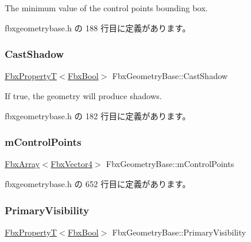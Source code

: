 The minimum value of the control points bounding box. 



 fbxgeometrybase.\+h の 188 行目に定義があります。

\mbox{\label{class_fbx_geometry_base_a64d3184a3bf9bcd97f7069176b0ad4c1}} 
\subsubsection{\texorpdfstring{Cast\+Shadow}{CastShadow}}
{\footnotesize\ttfamily \hyperlink{class_fbx_property_t}{Fbx\+PropertyT}$<$\hyperlink{fbxtypes_8h_a92e0562b2fe33e76a242f498b362262e}{Fbx\+Bool}$>$ Fbx\+Geometry\+Base\+::\+Cast\+Shadow}



If true, the geometry will produce shadows. 



 fbxgeometrybase.\+h の 182 行目に定義があります。

\mbox{\label{class_fbx_geometry_base_a88c6c0552ceb07b3a638cc3175fbe867}} 
\subsubsection{\texorpdfstring{m\+Control\+Points}{mControlPoints}}
{\footnotesize\ttfamily \hyperlink{class_fbx_array}{Fbx\+Array}$<$\hyperlink{class_fbx_vector4}{Fbx\+Vector4}$>$ Fbx\+Geometry\+Base\+::m\+Control\+Points}



 fbxgeometrybase.\+h の 652 行目に定義があります。

\mbox{\label{class_fbx_geometry_base_a51e2206786ddb6a94a15be4a8fd9517f}} 
\subsubsection{\texorpdfstring{Primary\+Visibility}{PrimaryVisibility}}
{\footnotesize\ttfamily \hyperlink{class_fbx_property_t}{Fbx\+PropertyT}$<$\hyperlink{fbxtypes_8h_a92e0562b2fe33e76a242f498b362262e}{Fbx\+Bool}$>$ Fbx\+Geometry\+Base\+::\+Primary\+Visibility}



